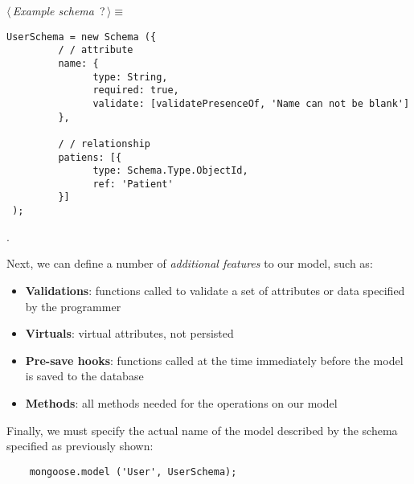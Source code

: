 	\begin{flushleft} \small
\begin{minipage}{\linewidth}\label{scrap1}\raggedright\small
{} $\langle\,${\itshape {Example schema}}\nobreak\ {\footnotesize {?}}$\,\rangle\equiv$
\vspace{-1ex}
\begin{list}{}{} \item

                \begin{lstlisting} 
UserSchema = new Schema ({
         / / attribute
         name: {
               type: String,
               required: true,
               validate: [validatePresenceOf, 'Name can not be blank']
         },

         / / relationship
         patiens: [{
               type: Schema.Type.ObjectId,
               ref: 'Patient'
         }]
 ); 
                \end{lstlisting}
        {\NWsep}
\end{list}
\vspace{-1.5ex}
\footnotesize
\begin{list}{}{\setlength{\itemsep}{-\parsep}\setlength{\itemindent}{-\leftmargin}}
\item {\NWtxtMacroNoRef}.

\item{}
\end{list}
\end{minipage}\vspace{4ex}
\end{flushleft}
Next, we can define a number of \emph{additional features} to our model, such as:

\begin{itemize}
	\item \textbf{Validations}: functions called to validate a set of attributes or data specified by the programmer
	\item \textbf{Virtuals}: virtual attributes, not persisted
	\item \textbf{Pre-save hooks}: functions called at the time immediately before the model is saved to the database
	\item \textbf{Methods}: all methods needed for the operations on our model 
\end{itemize}

Finally, we must specify the actual name of the model described by the schema specified as previously shown:

\begin{lstlisting}
	mongoose.model ('User', UserSchema);
\end{lstlisting}


